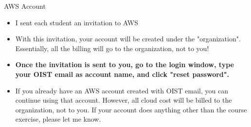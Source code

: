 \documentclass[unicode,11pt]{beamer}
\begin{document}
\begin{frame}{AWS Account}

\begin{itemize}
    \item I sent each student an invitation to AWS
    \item With this invitation, your account will be created under the "organization".
    Essentially, all the billing will go to the organization, not to you!
    \item \textbf{Once the invitation is sent to you, go to the login window, type your OIST email as account name, and click "reset password".}
    \item If you already have an AWS account created with OIST email, you can continue using that account.
    However, all cloud cost will be billed to the organization, not to you.
    If your account does anything other than the course exercise, please let me know.
\end{itemize}

\end{frame}
\end{document}
